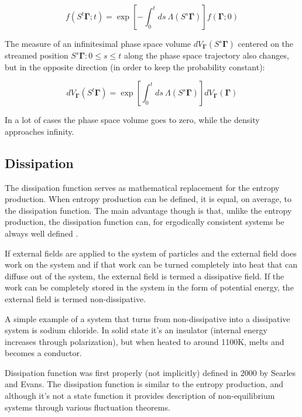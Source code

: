 \documentclass[a4paper,12pt,nofootinbib]{article}
\begin{document}
\begin{equation}
\label{distributionStreaming}
  f(S^t\bm{\Gamma};t)=\exp[-\int_0^t ds\ \Lambda(S^s\bm{\Gamma})]f(\bm{\Gamma};0)
\end{equation}

The measure of an infinitesimal phase space volume $dV_{\bm{\Gamma}}(S^s \bm{\Gamma})$ centered on the streamed position $S^s\bm{\Gamma} : 0 \leq s \leq t $ along the phase space trajectory also changes, but in the opposite direction (in order to keep the probability constant):

\begin{equation}
\label{PhaseVolumeExpansion}
  dV_{\bm{\Gamma}}(S^t \bm{\Gamma}) =\exp[\int_0^t ds\ \Lambda(S^s\bm{\Gamma})]dV_{\bm{\Gamma}}(\bm{\Gamma})
\end{equation}
 
In a lot of cases the phase space volume goes to zero, while the density approaches infinity.



\subsection{Dissipation}

The dissipation function serves as mathematical replacement for the entropy production. When entropy production can be defined, it is equal, on average, to the dissipation function. The main advantage though is that, unlike the entropy production, the dissipation function can, for ergodically consistent systems be always well defined \cite{Evans:2016tq}.

If external fields are applied to the system of particles and the external field does work on the system and if that work can be turned completely into heat that can diffuse out of the system, the external field is termed a dissipative field. If the work can be completely stored in the system in the form of potential energy, the external field is termed non-dissipative.

A simple example of a system that turns from non-dissipative into a dissipative system is sodium chloride. In solid state it's an insulator (internal energy increases through polarization), but when heated to around 1100K, melts and becomes a conductor.

Dissipation function was first properly (not implicitly) defined in 2000 by Searles and Evans.
The dissipation function is similar to the entropy production, and although it's not a state function it provides description of non-equilibrium systems through various fluctuation theorems.
\end{document}
